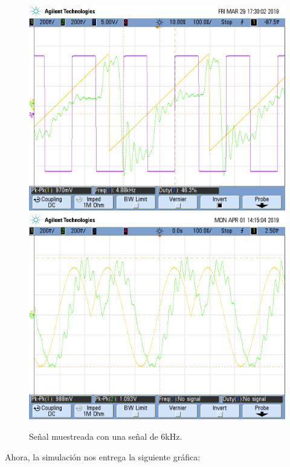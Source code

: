 \documentclass[../../ASSD_TP1_G7.tex]{subfiles}
\begin{document}
\begin{figure}[H]
\begin{centering}
\includegraphics[scale=0.25]{Imagenes/yh_pt6d_cuad2}\includegraphics[scale=0.25]{Imagenes/ej_6_d_syh}
\par\end{centering}
\caption{Señal muestreada con una señal de 6kHz.}
\end{figure}

Ahora, la simulación nos entrega la siguiente gráfica:
\end{document}
